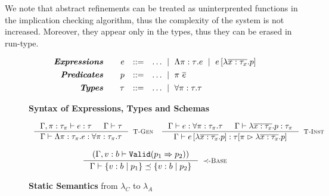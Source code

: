 We note that
abstract refinements 
can be treated as uninterprented functions in the implication
checking algorithm, thus the complexity of the system is not increased.
Moreover, they appear only in the types, thus they can be erased in run-type.
\begin{figure}[ht!]
\centering
$$
\begin{array}{rrcl}
\emphbf{Expressions} \quad 
  & e 
  & ::= 
  & 		 \dots
  \spmid \epabs{\rvar}{\tau}{e}
  \spmid \epapp{e}{\efunbar{x:\tau_x}{p}} 
  \\[0.05in] 

\emphbf{Predicates} \quad 
  & p
  & ::= 
  &		\dots
  \spmid \rvapp{\rvar}{e}  
  \\[0.05in] 
\emphbf{Types} \quad 
  & \tau 
  & ::= 
  &		 \dots
  \spmid \tpabs{\rvar}{\tau}{\tau}

\end{array}
$$
\caption{\textbf{Syntax of Expressions, Types and Schemas}}
\label{fig:syntax}
\end{figure}


\begin{figure}[ht!]

\medskip {}
$$\begin{array}{cc}
\inference
    {\hastype{\Gamma, \rvar:\tau_\rvar}{e}{\tau} &&
     \isWellFormed{\Gamma}{\tau} 
    }
    {\hastype{\Gamma}{\epabs{\rvar}{\tau_\rvar}{e}}{\tpabs{\rvar}{\tau_\rvar}{\tau}}}
    [\tpgen]
&  

\inference
    {\hastype{\Gamma}{e}{\tpabs{\rvar}{\tau_\rvar}{\tau}} && 
     \hastype{\Gamma}{\efunbar{x:\tau_x}{p}}{\tau_\rvar}
    }
    {\hastype{\Gamma}
             {\epapp{e}{\efunbar{x:\tau_x}{p}}}
             {\rpinst{\tau}{\rvar}{\efunbar{x:\tau_x}{p}}}
    }
    [\tpinst]
\end{array}$$

\medskip {}
$$
\inference
   {(\Gamma, v:b \vdash \texttt{Valid}(p_1 \Rightarrow p_2))}
   {\isSubType{\Gamma}{\tref{b}{p_1}}{\tref{b}{p_2}}}
   [\tsubBase]
$$
\caption{\textbf{Static Semantics} from $\lambda_C$ to $\lambda_A$}
\label{fig:rules}
\end{figure}
